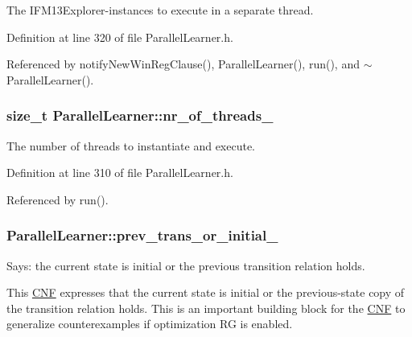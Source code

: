 The I\-F\-M13\-Explorer-\/instances to execute in a separate thread. 



Definition at line 320 of file Parallel\-Learner.\-h.



Referenced by notify\-New\-Win\-Reg\-Clause(), Parallel\-Learner(), run(), and $\sim$\-Parallel\-Learner().

\hypertarget{classParallelLearner_a170a0abad017845877039684507e7a66}{
\subsubsection[{nr\-\_\-of\-\_\-threads\-\_\-}]{\setlength{\rightskip}{0pt plus 5cm}size\-\_\-t Parallel\-Learner\-::nr\-\_\-of\-\_\-threads\-\_\-\hspace{0.3cm}{\ttfamily [protected]}}}\label{classParallelLearner_a170a0abad017845877039684507e7a66}


The number of threads to instantiate and execute. 



Definition at line 310 of file Parallel\-Learner.\-h.



Referenced by run().

\hypertarget{classParallelLearner_ac73d9338262855f61f23a65d1df0647c}{
\subsubsection[{prev\-\_\-trans\-\_\-or\-\_\-initial\-\_\-}]{ Parallel\-Learner\-::prev\-\_\-trans\-\_\-or\-\_\-initial\-\_\-\hspace{0.3cm}{\ttfamily [protected]}}}\label{classParallelLearner_ac73d9338262855f61f23a65d1df0647c}


Says\-: the current state is initial or the previous transition relation holds. 

This \hyperlink{classCNF}{C\-N\-F} expresses that the current state is initial or the previous-\/state copy of the transition relation holds. This is an important building block for the \hyperlink{classCNF}{C\-N\-F} to generalize counterexamples if optimization R\-G is enabled. 

